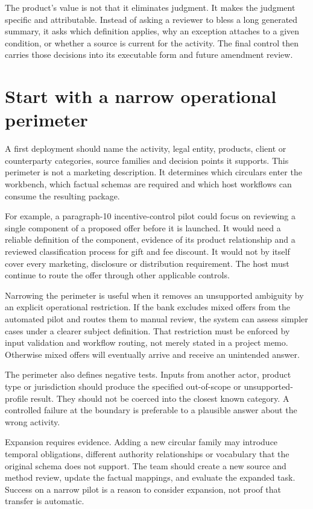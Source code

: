 \documentclass[12pt,a4paper,oneside,openany]{book}
\begin{document}
The product's value is not that it eliminates judgment. It makes the judgment
specific and attributable. Instead of asking a reviewer to bless a long generated
summary, it asks which definition applies, why an exception attaches to a given
condition, or whether a source is current for the activity. The final control
then carries those decisions into its executable form and future amendment review.

\section{Start with a narrow operational perimeter}

A first deployment should name the activity, legal entity, products, client or
counterparty categories, source families and decision points it supports. This
perimeter is not a marketing description. It determines which circulars enter the
workbench, which factual schemas are required and which host workflows can consume
the resulting package.

For example, a paragraph-10 incentive-control pilot could focus on reviewing a
single component of a proposed offer before it is launched. It would need a
reliable definition of the component, evidence of its product relationship and a
reviewed classification process for gift and fee discount. It would not by itself
cover every marketing, disclosure or distribution requirement. The host must
continue to route the offer through other applicable controls.

Narrowing the perimeter is useful when it removes an unsupported ambiguity by an
explicit operational restriction. If the bank excludes mixed offers from the
automated pilot and routes them to manual review, the system can assess simpler
cases under a clearer subject definition. That restriction must be enforced by
input validation and workflow routing, not merely stated in a project memo.
Otherwise mixed offers will eventually arrive and receive an unintended answer.

The perimeter also defines negative tests. Inputs from another actor, product type
or jurisdiction should produce the specified out-of-scope or unsupported-profile
result. They should not be coerced into the closest known category. A controlled
failure at the boundary is preferable to a plausible answer about the wrong
activity.

Expansion requires evidence. Adding a new circular family may introduce temporal
obligations, different authority relationships or vocabulary that the original
schema does not support. The team should create a new source and method review,
update the factual mappings, and evaluate the expanded task. Success on a narrow
pilot is a reason to consider expansion, not proof that transfer is automatic.
\end{document}
